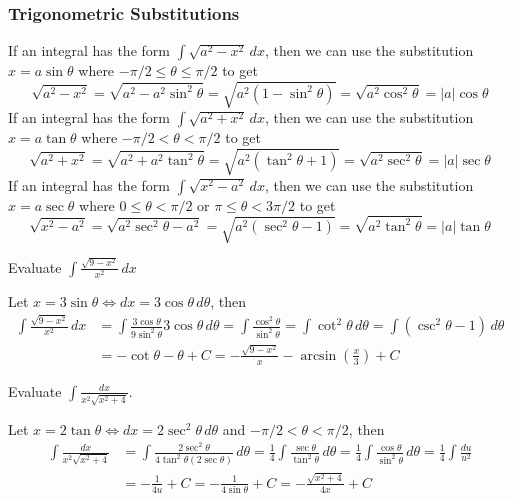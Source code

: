 \subsubsection*{Trigonometric Substitutions}
If an integral has the form \(\displaystyle{\int\sqrt{a^2-x^2}\,dx}\),
then we can use the substitution \(x=a\sin\theta\) where
\(-\pi/2\leq\theta\leq\pi/2\) to get
\[\sqrt{a^2-x^2}=\sqrt{a^2-a^2\sin^2\theta}=\sqrt{a^2(1-\sin^2\theta)}
=\sqrt{a^2\cos^2\theta}=|a|\cos\theta\]
If an integral has the form \(\displaystyle{\int\sqrt{a^2+x^2}\,dx}\),
then we can use the substitution \(x=a\tan\theta\) where
\(-\pi/2<\theta<\pi/2\) to get
\[\sqrt{a^2+x^2}=\sqrt{a^2+a^2\tan^2\theta}=\sqrt{a^2(\tan^2\theta+1)}
=\sqrt{a^2\sec^2\theta}=|a|\sec\theta\]
If an integral has the form \(\displaystyle{\int\sqrt{x^2-a^2}\,dx}\),
then we can use the substitution \(x=a\sec\theta\) where
\(0\leq\theta<\pi/2\) or \(\pi\leq\theta<3\pi/2\) to get
\[\sqrt{x^2-a^2}=\sqrt{a^2\sec^2\theta-a^2}=\sqrt{a^2(\sec^2\theta-1)}
=\sqrt{a^2\tan^2\theta}=|a|\tan\theta\]
\begin{problem}
    Evaluate \(\displaystyle{\int\frac{\sqrt{9-x^2}}{x^2}\,dx}\)
\end{problem}
\begin{solution}
    Let \(x=3\sin\theta\iff dx=3\cos\theta\,d\theta\), then
    \begin{align*}
        \int\frac{\sqrt{9-x^2}}{x^2}\,dx
        &= \int\frac{3\cos\theta}{9\sin^2\theta}3\cos\theta\,d\theta
        =\int\frac{\cos^2\theta}{\sin^2\theta}=\int\cot^2\theta\,d\theta
        =\int(\csc^2\theta-1)\,d\theta \\
        &=-\cot\theta-\theta+C
        =-\frac{\sqrt{9-x^2}}{x}-\arcsin\left(\frac{x}{3}\right)+C
    \end{align*}
\end{solution}
\begin{problem}
    Evaluate \(\displaystyle{\int\frac{dx}{x^2\sqrt{x^2+4}}}\).
\end{problem}
\begin{solution}
    Let \(x=2\tan\theta\iff dx=2\sec^2\theta\,d\theta\) and
    \(-\pi/2<\theta<\pi/2\), then
    \begin{align*}
        \int\frac{dx}{x^2\sqrt{x^2+4}}
        &= \int\frac{2\sec^2\theta}{4\tan^2\theta(2\sec\theta)}\,d\theta
        =\frac{1}{4}\int\frac{\sec\theta}{\tan^2\theta}\,d\theta
        =\frac{1}{4}\int\frac{\cos\theta}{\sin^2\theta}\,d\theta
        =\frac{1}{4}\int\frac{du}{u^2} \\
        &= -\frac{1}{4u}+C=-\frac{1}{4\sin\theta}+C
        =-\frac{\sqrt{x^2+4}}{4x}+C
    \end{align*}
\end{solution}
